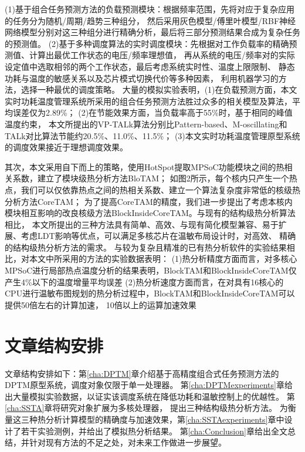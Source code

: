 (1)基于组合任务预测方法的负载预测模块：根据频率范围，先将对应于复杂应用的任务分为随机/周期/趋势三种组分， 然后采用灰色模型/傅里叶模型/RBF神经网络模型分别对这三种组分进行精确分析，最后将三部分预测结果合成为复杂任务的预测值。
(2)基于多种调度算法的实时调度模块：先根据对工作负载率的精确预测值、计算出最优工作状态的电压/频率理想值， 再从系统的电压/频率对的实际设定值中选取相邻的两个工作状态，最后考虑系统实时性、温度上限限制、 静态功耗与温度的敏感关系以及芯片模式切换代价等多种因素， 利用机器学习的方法，选择一种最优的调度策略。
大量的模拟实验表明，(1)在负载预测方面，本文实时功耗温度管理系统所采用的组合任务预测方法胜过众多的相关模型及算法，平均误差仅为2.89\%； (2)在节能效果方面，当负载率高于55\%时，基于相同的峰值温度约束， 本文所提出的VP-TALk算法分别比Pattern-based、M-oscillating和TALk对比算法节能约20.5\%、11.0\%、11.5\%； (3)本文实时功耗温度管理原型系统的调度效果接近于理想调度效果。

其次，本文采用自下而上的策略，使用HotSpot提取MPSoC功能模块之间的热相关系数，建立了模块级热分析方法BloTAM； 如图2所示，每个核内只产生一个热点，我们可以仅依靠热点之间的热相关系数、建立一个算法复杂度非常低的核级热分析方法CoreTAM； 为了提高CoreTAM的精度，我们进一步提出了考虑本核内模块相互影响的改良核级方法BlockInsideCoreTAM。与现有的结构级热分析算法相比， 本文所提出的三种方法具有简单、高效、与现有简化模型兼容、易于扩展、考虑LDT影响等优点，可以满足多核芯片在温敏布局设计时，对高效、 精确的结构级热分析方法的需求。
与较为复杂且精准的已有热分析软件的实验结果相比，对本文中所采用的方法的实验数据表明：
(1)热分析精度方面而言，对多核心MPSoC进行局部热点温度分析的结果表明，BlockTAM和BlockInsideCoreTAM仅产生4\%以下的温度增量平均误差
(2)热分析速度方面而言，在对具有16核心的CPU进行温敏布图规划的热分析过程中，BlockTAM和BlockInsideCoreTAM可以提供50倍左右的计算加速， 10倍以上的运算加速效果

\section{文章结构安排}
文章结构安排如下：第\ref{cha:DPTM}章介绍基于高精度组合式任务预测方法的DPTM原型系统，调度对象仅限于单一处理器。 第\ref{cha:DPTMexperiments}章给出大量模拟实验数据，以证实该调度系统在降低功耗和温敏控制上的优越性。 第\ref{cha:SSTA}章将研究对象扩展为多核处理器， 提出三种结构级热分析方法。 为衡量这三种热分析计算模型的精确度与加速效果，第\ref{cha:SSTAexperiments}章中设计了若干实验测例，并给出了模拟热分析结果。 第\ref{cha:Conclusion}章给出全文总结，并针对现有方法的不足之处，对未来工作做进一步展望。 